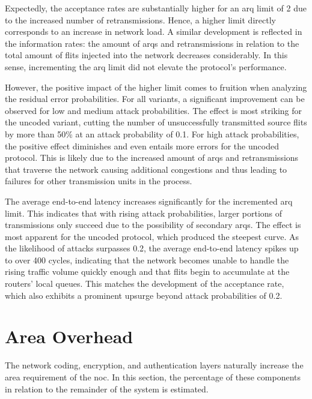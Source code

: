 Expectedly, the acceptance rates are substantially higher for an \gls{arq} limit of 2 due to the increased number of retransmissions. Hence, a higher
limit directly corresponds to an increase in network load. A similar development is reflected in the information rates: the amount of \glspl{arq} and
retransmissions in relation to the total amount of flits injected into the network decreases considerably. In this sense, incrementing the \gls{arq}
limit did not elevate the protocol's performance.

However, the positive impact of the higher limit comes to fruition when analyzing the residual error probabilities. For all variants, a significant
improvement can be observed for low and medium attack probabilities. The effect is most striking for the uncoded variant, cutting the number of
unsuccessfully transmitted source flits by more than 50\% at an attack probability of 0.1. For high attack probabilities, the positive effect
diminishes and even entails more errors for the uncoded protocol. This is likely due to the increased amount of \glspl{arq} and retransmissions
that traverse the network causing additional congestions and thus leading to failures for other transmission units in the process.

The average end-to-end latency increases significantly for the incremented \gls{arq} limit. This indicates that with rising attack probabilities,
larger portions of transmissions only succeed due to the possibility of secondary \glspl{arq}. The effect is most apparent for the uncoded protocol, which
produced the steepest curve. As the likelihood of attacks surpasses 0.2, the average end-to-end latency spikes up to over 400 cycles, indicating that the
network becomes unable to handle the rising traffic volume quickly enough and that flits begin to accumulate at the routers' local queues. This matches
the development of the acceptance rate, which also exhibits a prominent upsurge beyond attack probabilities of 0.2.

\section{Area Overhead}\label{sec:areaoverhead}
The network coding, encryption, and authentication layers naturally increase the area requirement of the \gls{noc}. In this section, the percentage of
these components in relation to the remainder of the system is estimated.

